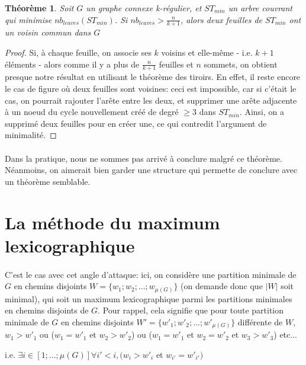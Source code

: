 \documentclass[a4paper]{article}
\newtheorem{theorem}{Théorème}
\theoremstyle{definition}
\theoremstyle{remark}
\begin{document}
\begin{theorem}
Soit $G$ un graphe connexe k-régulier, et $ST_{min}$ un arbre couvrant 
qui minimise $nb_{leaves}(ST_{min})$. Si $nb_{leaves} > \frac{n}{k+1}$,
alors deux feuilles de $ST_{min}$ ont un voisin commun dans $G$
\end{theorem}
\begin{proof}
Si, à chaque feuille, on associe ses $k$ voisins et elle-même - i.e. $k+1$ éléments - alors comme il y a plus de $\frac{n}{k+1}$ feuilles et $n$
sommets, on obtient presque notre résultat en utilisant le théorème des
tiroirs. En effet, il reste encore le cas de figure où deux feuilles sont
voisines: ceci est impossible, car si c'était le cas, on pourrait 
rajouter l'arête entre les deux, et supprimer une arête adjacente à un
noeud du cycle nouvellement créé de degré $\geq 3$ dans $ST_{min}$. 
Ainsi, on a supprimé deux feuilles pour en créer une, ce qui contredit
l'argument de minimalité.
\end{proof}

\paragraph{}
Dans la pratique, nous ne sommes pas arrivé à conclure malgré ce théorème. Néanmoins, on aimerait bien garder une structure qui permette
de conclure avec un théorème semblable.

\section{La méthode du maximum lexicographique}

\paragraph{}
C'est le cas avec cet angle d'attaque: ici, on considère une partition minimale de $G$ en chemins disjoints $W = \{w_{1};w_{2};...;w_{\mu(G)}\}$ (on demande donc que $|W|$ soit minimal), qui soit un maximum 
lexicographique parmi les partitions minimales en chemins disjoints de $G$. Pour rappel, cela signifie que pour toute partition minimale de $G$ 
en chemins disjoints $W'=\{w'_{1};w'_{2};...;w'_{\mu(G)}\}$ différente de $W$, $w_{1} > w'_{1}$ ou ($w_{1}=w'_{1}$ et $w_{2} > w'_{2}$) ou ($w_{1}=w'_{1}$ et $w_{2} = w'_{2}$ et $w_{3} > w'_{3}$) etc...

i.e. $\exists i \in [1;...;\mu(G)] \forall i' < i, (w_{i} > w'_{i}$ et $w_{i'}=w'_{i'})$
\end{document}
